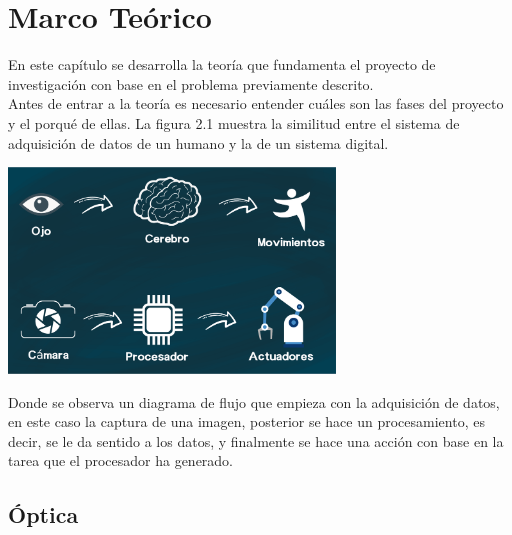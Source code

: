 \chapter{Marco Teórico}


En este capítulo se desarrolla la teoría que fundamenta el proyecto de investigación con base
en el problema previamente descrito.\\
Antes de entrar a la teoría es necesario entender cuáles son las fases del proyecto y
el porqué de ellas.
La figura 2.1 muestra la similitud entre el sistema de adquisición de datos
de un humano y la de un sistema digital.
\begin{center}
	\includegraphics[width=0.65\textwidth]{Contenido/Cuerpo/Capitulo2/Fig1.eps}
	\label{fig:MarcoTeorico:Fig1}
\end{center}
Donde se observa un diagrama de flujo que empieza con la adquisición de datos, en este
caso la captura de una imagen, posterior se hace un procesamiento, es decir, se le da
sentido a los datos, y finalmente se hace una acción con base en la tarea que el procesador
ha generado.


\section{Óptica}

